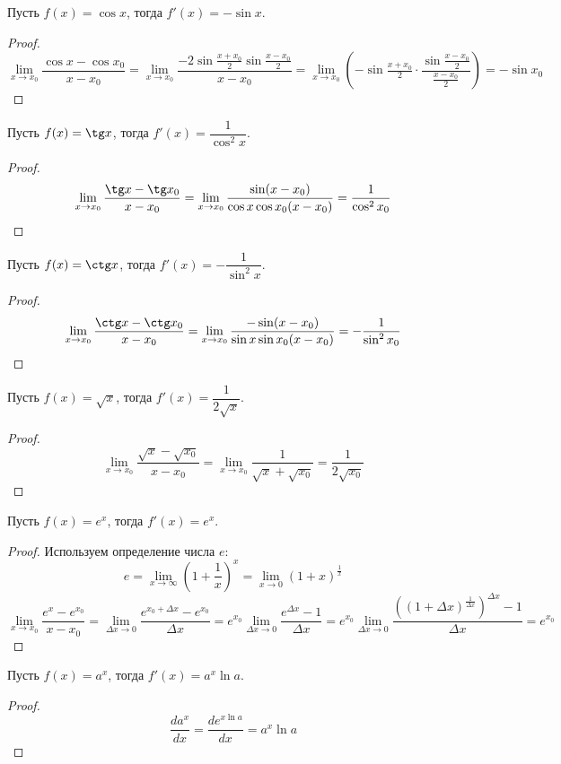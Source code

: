 \documentclass[12pt]{article}
\begin{document}
\begin{statement}
    Пусть $f(x)=\cos x$, тогда $f'(x)=-\sin x$.
\end{statement}
\begin{proof}
    $$\lim_{x\to x_0}\frac{\cos x-\cos x_0}{x-x_0}=\lim_{x\to x_0}\frac{-2\sin\frac{x+x_0}{2}\sin\frac{x-x_0}{2}}{x-x_0}=\lim_{x\to x_0}\left(-\sin\tfrac{x+x_0}{2}\cdot\frac{\sin\frac{x-x_0}{2}}{\frac{x-x_0}{2}}\right)=-\sin x_0$$
\end{proof}
\begin{statement}
    Пусть $f(x)=\tg x$, тогда $f'(x)=\dfrac{1}{\cos^2x}$.
\end{statement}
\begin{proof}
    $$\lim_{x\to x_0}\frac{\tg x-\tg x_0}{x-x_0}=\lim_{x\to x_0}\frac{\sin(x-x_0)}{\cos x\cos x_0 (x-x_0)}=\frac{1}{\cos^2x_0}$$
\end{proof}
\begin{statement}
    Пусть $f(x)=\ctg x$, тогда $f'(x)=-\dfrac{1}{\sin^2x}$.
\end{statement}
\begin{proof}
    $$\lim_{x\to x_0}\frac{\ctg x-\ctg x_0}{x-x_0}=\lim_{x\to x_0}\frac{-\sin(x-x_0)}{\sin x\sin x_0 (x-x_0)}=-\frac{1}{\sin^2x_0}$$
\end{proof}
\begin{statement}
    Пусть $f(x)=\sqrt{x}$, тогда $f'(x)=\dfrac{1}{2\sqrt{x}}$.
\end{statement}
\begin{proof}
    $$\lim_{x\to x_0}\frac{\sqrt{x}-\sqrt{x_0}}{x-x_0}=\lim_{x\to x_0}\frac{1}{\sqrt{x}+\sqrt{x_0}}=\frac{1}{2\sqrt{x_0}}$$
\end{proof}
\begin{statement}
    Пусть $f(x)=e^x$, тогда $f'(x)=e^x$.
\end{statement}
\begin{proof}
    Используем определение числа $e$:
    $$e=\lim_{x\to\infty}\left(1+\frac{1}{x}\right)^x=\lim_{x\to0}\left(1+x\right)^\frac{1}{x}$$
    $$\lim_{x\to x_0}\frac{e^x-e^{x_0}}{x-x_0}=\lim_{\Delta x\to0}\frac{e^{x_0+\Delta x}-e^{x_0}}{\Delta x}=e^{x_0}\lim_{\Delta x\to0}\frac{e^{\Delta x} - 1}{\Delta x}=e^{x_0}\lim_{\Delta x\to0}\frac{\left((1+\Delta x)^{\frac{1}{\Delta x}}\right)^{\Delta x}-1}{\Delta x}=e^{x_0}$$
\end{proof}
\begin{statement}
    Пусть $f(x)=a^x$, тогда $f'(x)=a^x\ln a$.
\end{statement}
\begin{proof}
    $$\frac{da^x}{dx}=\frac{de^{x\ln a}}{dx}=a^x\ln a$$
\end{proof}
\end{document}
